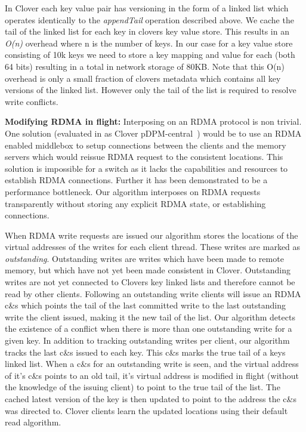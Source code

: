 In Clover each key value pair has versioning in the form of a linked
list which operates identically to the \textit{appendTail} operation
described above. We cache the tail of the linked list for each key in
clovers key value store. This results in an \textit{O(n)} overhead
where n is the number of keys. In our case for a key value store
consisting of 10k keys we need to store a key mapping and value for
each (both 64 bits) resulting in a total in network storage of 80KB.
Note that this O(n) overhead is only a small fraction of clovers
metadata which contains all key versions of the linked list. However
only the tail of the list is required to resolve write conflicts.

\textbf{Modifying RDMA in flight:} Interposing on an RDMA protocol is
non trivial. One solution (evaluated in as Clover
pDPM-central~\cite{clover}) would be to use an RDMA enabled middlebox
to setup connections between the clients and the memory servers which
would reissue RDMA request to the consistent locations. This solution
is impossible for a switch as it lacks the capabilities and resources
to establish RDMA connections. Further it has been demonstrated to be
a performance bottleneck. Our algorithm interposes on RDMA requests
transparently without storing any explicit RDMA state, or establishing
connections.

When RDMA write requests are issued our algorithm stores the locations
of the virtual addresses of the writes for each client thread. These
writes are marked as \textit{outstanding}. Outstanding writes are
writes which have been made to remote memory, but which have not yet
been made consistent in Clover. Outstanding writes are not yet
connected to Clovers key linked lists and therefore cannot be read by
other clients. Following an outstanding write clients will issue an
RDMA c\&s which points the tail of the last committed write to the last
outstanding write the client issued, making it the new tail of the
list. Our algorithm detects the existence of a conflict when there is
more than one outstanding write for a given key. In addition to
tracking outstanding writes per client, our algorithm tracks the last
c\&s issued to each key. This c\&s marks the true tail of a keys linked
list. When a c\&s for an outstanding write is seen, and the virtual
address of it's c\&s points to an old tail, it's virtual address is
modified in flight (without the knowledge of the issuing client) to
point to the true tail of the list. The cached latest version of the
key is then updated to point to the address the c\&s was directed to.
Clover clients learn the updated locations using their default read
algorithm.

